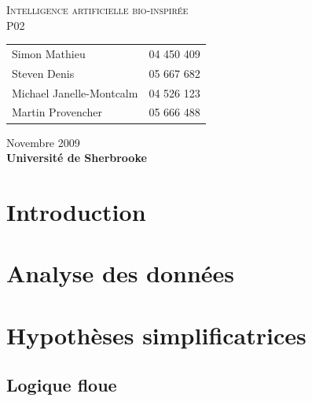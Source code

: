 \documentclass[12pt,letterpaper]{article}
\begin{document}
\renewcommand{\labelitemi}{$\bullet$}
\newcommand{\unit}[1]{\ \mathrm{#1}}
\newcommand{\degree}{\ensuremath{^\circ}}

\thispagestyle{empty}
\begin{center}
	\vspace{20pt}
	\large{\textsc{
		Intelligence artificielle bio-inspirée\\
	}}
	\vspace{20pt}
	\large{\textsc{
		P02
	}}
	\vfill
	\begin{tabular}{ll}
      Simon Mathieu & 04 450 409 \\
      Steven Denis & 05 667 682 \\
	  Michael Janelle-Montcalm & 04 526 123 \\
	  Martin Provencher &	05 666 488 \\
	\end{tabular}
	\vfill
	Novembre 2009 \\
	\textbf{Université de Sherbrooke}
	\vspace{20pt}
\end{center}
\clearpage
\begin{spacing}{0.1}
\tableofcontents
\end{spacing}
\clearpage

\section{Introduction}

\section{Analyse des données} %

\section{Hypothèses simplificatrices}

\subsection{Logique floue}
\end{document}

